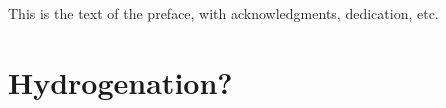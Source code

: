 \documentclass[hidelinks,phd,final]{pittetd}
\begin{document}
\maketitle
\makecommittee
\copyrightpage                     
\begin{abstract}
The abstract of the document.
This document is a sample file for the creation of ETD's at Pitt through \LaTeX.
\end{abstract}

\tableofcontents
\listoftables                      
\listoffigures                
\preface
This is the text of the preface, with acknowledgments, dedication, etc. 
%
%







\appendix     


\chapter{Hydrogenation?}

\end{document}

